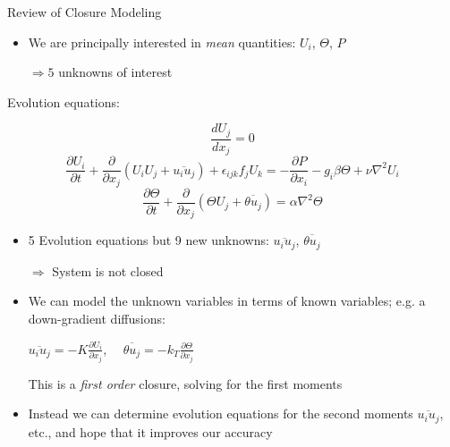 \documentclass[landscape]{seminar}
\newcommand{\pdiff}[2]{\frac{\partial #1}{\partial #2}}
\begin{document}
\begin{slide}

\begin{center}
Review of Closure Modeling
\end{center}

\begin{itemize}

  \item We are principally interested in \emph{mean} quantities: $U_i$, $\Theta$, $P$

  $\Rightarrow 5$ unknowns of interest

\end{itemize}

Evolution equations:

\begin{equation*}
\frac{dU_j}{dx_j} = 0
\end{equation*}
\begin{equation*}
\pdiff{U_i}{t} + \pdiff{}{x_j}\left(U_i U_j + \overline{u_i u_j}\right) + \epsilon_{ijk} f_j U_k = -\pdiff{P}{x_i} - g_i \beta \Theta + \nu \nabla^2 U_i
\end{equation*}
\begin{equation*}
\pdiff{\Theta}{t} + \pdiff{}{x_j}\left(\Theta U_j + \overline{\theta u_j}\right) = \alpha \nabla^2 \Theta
\end{equation*}

\begin{itemize}
  \item 5 Evolution equations but 9 new unknowns: $\overline{u_i u_j}$, $\overline{\theta u_j}$

  $\Rightarrow$ System is not closed
\end{itemize}

\end{slide}
\begin{slide}

\begin{itemize}
  \item We can model the unknown variables in terms of known variables; e.g. a down-gradient diffusions:
  \begin{center}
    $\overline{u_i u_j} = -K \pdiff{U_i}{x_j}$, \ \  $\overline{\theta u_j} = -k_T \pdiff{\Theta}{x_j}$
  \end{center}

  This is a \emph{first order} closure, solving for the first moments

  \item Instead we can determine evolution equations for the second moments $\overline{u_i u_j}$, etc., and hope that it improves our accuracy

\end{itemize}

\end{slide}
\end{document}
